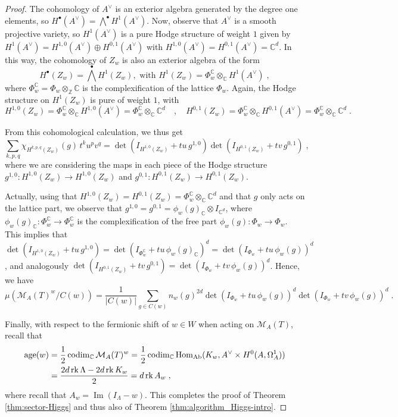 \documentclass[11pt,english]{amsart}
\numberwithin{equation}{section}
\numberwithin{figure}{section}
\theoremstyle{plain}
\theoremstyle{plain}
\theoremstyle{definition}
\theoremstyle{remark}
\DeclareMathOperator{\image}{Im}
\newcommand{\ZZ}{\mathbb{Z}}
\newcommand{\CC}{\mathbb{C}}
\newcommand{\codim}{\operatorname{codim}}
\newcommand{\Hom}{\operatorname{Hom}}
\newcommand{\rk}{\operatorname{rk}}
\newcommand{\age}{\operatorname{age}}
\newcommand{\Ab}{\textup{Ab}}
\begin{document}
\begin{proof}
The cohomology of $A^\vee$ is an exterior algebra generated by the degree one elements, so $H^\bullet(A^\vee) = \bigwedge^\bullet H^1(A^\vee)$. Now, observe that $A^\vee$ is a smooth projective variety, so $H^1(A^\vee)$ is a pure Hodge structure of weight $1$ given by $H^1(A^\vee) = H^{1,0}(A^\vee) \oplus H^{0,1}(A^\vee)$ with $H^{1,0}(A^\vee) = H^{0,1}(A^\vee) = \CC^d$. In this way, the cohomology of $Z_w$ is also an exterior algebra of the form
    $$
H^\bullet(Z_w) = \bigwedge^\bullet H^1(Z_w), \textrm{ with } H^1(Z_w) = \Phi_w^\CC \otimes_\CC H^1(A^\vee)\; , 
$$
where $\Phi_w^\CC = \Phi_w \otimes_\ZZ \CC$ is the complexification of the lattice $\Phi_w$. Again, the Hodge structure on $H^1(Z_w)$ is pure of weight $1$, with
$$
    H^{1,0}(Z_w) = \Phi_w^\CC \otimes_\CC H^{1,0}(A^\vee) = \Phi_w^\CC \otimes_\CC \CC^d\quad , \quad H^{0,1}(Z_w) = \Phi_w^\CC \otimes_\CC H^{0,1}(A^\vee) = \Phi_w^\CC \otimes_\CC \CC^d\; .
$$

From this cohomological calculation, we thus get
$$
    \sum_{k, p, q} \chi_{H^{k,p,q}(Z_w)}(g)\,t^ku^p v^q = \det(I_{H^{1,0}(Z_w)} + tu\,g^{1,0})\det(I_{H^{0,1}(Z_w)} + tv\,g^{0,1})\; ,
$$
where we are considering the maps in each piece of the Hodge structure $g^{1,0}: H^{1,0}(Z_w) \to H^{1,0}(Z_w)$ and $g^{0,1}: H^{0,1}(Z_w) \to H^{0,1}(Z_w)$.

Actually, using that $H^{1,0}(Z_w) = H^{0,1}(Z_w) = \Phi_w^\CC \otimes_\CC \CC^d$ and that $g$ only acts on the lattice part, we observe that $g^{1,0} = g^{0,1} = \phi_w(g)_\CC \otimes I_{\CC^d}$, where $\phi_w(g)_\CC: \Phi_w^\CC \to \Phi_w^\CC $ is the complexification of the free part $\phi_w(g): \Phi_w \to \Phi_w$.
This implies that $\det(I_{H^{1,0}(Z_w)} + tu\,g^{1,0}) = \det(I_{\Phi_w^\CC} + tu\,\phi_w(g)_\CC)^d = \det(I_{\Phi_w} + tu\,\phi_w(g))^d$, and analogously $\det(I_{H^{0,1}(Z_w)} + tv\,g^{0,1}) = \det(I_{\Phi_w} + tv\,\phi_w(g))^d$. Hence, we have
$$
    \mu(\mathcal{M}_A(T)^w / C(w)) = \frac{1}{|C(w)|} \sum_{g \in C(w)}
   n_w(g)^{2d} \det(I_{\Phi_w} + tu\,\phi_w(g))^d\det(I_{\Phi_w} + tv\,\phi_w(g))^d\; .
$$



Finally, with respect to the fermionic shift of $w \in W$ when acting on $\mathcal{M}_A(T)$, recall that
\begin{align*}
    \age(w) &= \frac{1}{2}\codim_\CC \mathcal{M}_A(T)^w = \frac{1}{2}\codim_\CC \Hom_{\Ab}(K_w, A^\vee \times H^0(A, \Omega^1_A)) \\
    &= \frac{2d\rk \Lambda - 2d \rk K_w}{2} = d\rk A_w\; ,
\end{align*}
where recall that $A_w = \image(I_\Lambda - w)$. This completes the proof of Theorem \ref{thm:sector-Higgs} and thus also of Theorem \ref{thm:algorithm_Higgs-intro}.
\end{proof}
\end{document}
